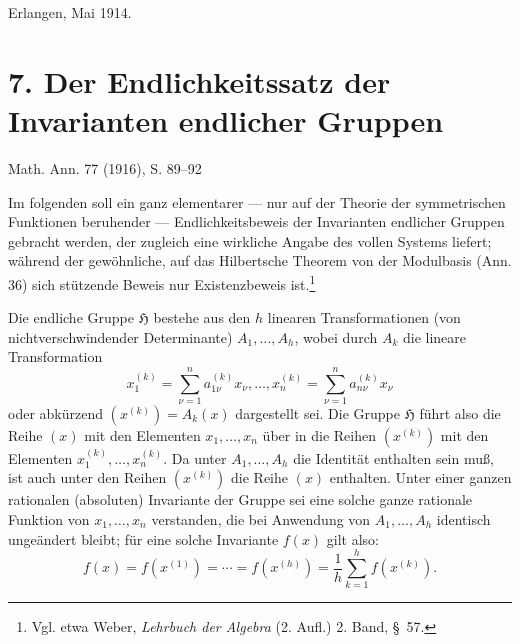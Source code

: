 \documentclass[11pt]{article}
\begin{document}
Erlangen, Mai 1914.

\clearpage

\providecommand{\Hgrp}{\mathfrak{H}}
\providecommand{\GaloisRes}{\Phi}
\providecommand{\pol}[2]{\left(#1\frac{\partial}{\partial #2}\right)}
\providecommand{\Deltaop}{\Delta\!\left(\frac{\partial}{\partial x},\frac{\partial}{\partial y},\frac{\partial}{\partial z}\right)}
\providecommand{\Omegaop}{\Omega}


\section*{7. Der Endlichkeitssatz der Invarianten endlicher Gruppen}
\begin{center}
Math. Ann. 77 (1916), S. 89--92
\end{center}

Im folgenden soll ein ganz elementarer --- nur auf der Theorie der symmetrischen Funktionen beruhender --- Endlichkeitsbeweis der Invarianten endlicher Gruppen gebracht werden, der zugleich eine wirkliche Angabe des vollen Systems liefert; während der gewöhnliche, auf das Hilbertsche Theorem von der Modulbasis (Ann. 36) sich stützende Beweis nur Existenzbeweis ist.\footnote{Vgl. etwa Weber, \emph{Lehrbuch der Algebra} (2. Aufl.) 2. Band, \S\ 57.}

Die endliche Gruppe $\Hgrp$ bestehe aus den $h$ linearen Transformationen (von nichtverschwindender Determinante) $A_1,\ldots,A_h$, wobei durch $A_k$ die lineare Transformation
\[
  x_1^{(k)}=\sum_{\nu=1}^{n}a_{1\nu}^{(k)}x_\nu,\ldots,
  x_n^{(k)}=\sum_{\nu=1}^{n}a_{n\nu}^{(k)}x_\nu
\]
oder abkürzend $(x^{(k)})=A_k(x)$ dargestellt sei. Die Gruppe $\Hgrp$ führt also die Reihe $(x)$ mit den Elementen $x_1,\ldots,x_n$ über in die Reihen $(x^{(k)})$ mit den Elementen $x_1^{(k)},\ldots,x_n^{(k)}$. Da unter $A_1,\ldots,A_h$ die Identität enthalten sein muß, ist auch unter den Reihen $(x^{(k)})$ die Reihe $(x)$ enthalten. Unter einer ganzen rationalen (absoluten) Invariante der Gruppe sei eine solche ganze rationale Funktion von $x_1,\ldots,x_n$ verstanden, die bei Anwendung von $A_1,\ldots,A_h$ identisch ungeändert bleibt; für eine solche Invariante $f(x)$ gilt also:
\begin{equation}
  f(x)=f(x^{(1)})=\cdots=f(x^{(h)})=
  \frac1h\sum_{k=1}^{h}f(x^{(k)}).
\tag{1}
\end{equation}
\end{document}
